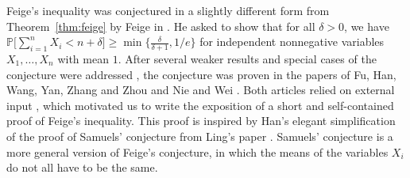 \documentclass[10pt]{article}
\newcommand{\Pb}{\mathbb P}
\begin{document}
Feige's inequality was conjectured in a slightly different form from Theorem~\ref{thm:feige} by Feige in \cite{F06}. He asked to show that for all $\delta>0$, we have $\Pb\big[\sum_{i=1}^n X_i<n+\delta\big]\geq \min\{\frac{\delta}{\delta+1}, 1/e\}$ for independent nonnegative variables $X_1, \dots, X_n$ with mean $1$. After several weaker results and special cases of the conjecture were addressed \cite{AAMM24, EF25, G20, GHLL20, HZZ10}, the conjecture was proven in the papers of Fu, Han, Wang, Yan, Zhang and Zhou \cite{FHWYZZ26} and Nie and Wei \cite{NW26}. Both articles relied on external input \cite{VT26}, which motivated us to write the exposition of a short and self-contained proof of Feige's inequality. This proof is inspired by Han's elegant simplification \cite{Han26} of the proof of Samuels' conjecture from Ling's paper \cite{Ling26}. Samuels' conjecture \cite{S66} is a more general version of Feige's conjecture, in which the means of the variables $X_i$ do not all have to be the same.
\end{document}
